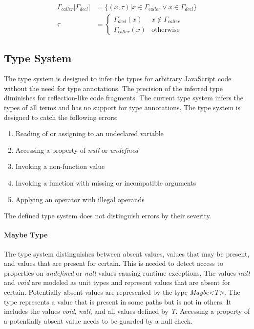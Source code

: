 \begin{align*}
	\Gamma_{caller}\Big\lbrack\Gamma_{decl}\Big\rbrack &= \lbrace (x, \tau) | x \in \Gamma_{caller} \vee x \in \Gamma_{decl} \rbrace \\
	\tau &= \begin{cases}
		\Gamma_{decl}(x) & x \notin \Gamma_{caller} \\
		\Gamma_{caller}(x) & \text{otherwise}
	\end{cases}
\end{align*}

\subsection{Type System}\label{sec:type-system}
The type system is designed to infer the types for arbitrary JavaScript code without the need for type annotations. The precision of the inferred type diminishes for reflection-like code fragments. The current type system infers the types of all terms and has no support for type annotations. The type system is designed to catch the following errors:

\begin{enumerate}
	\item Reading of or assigning to an undeclared variable\label{item:absent-values}
	\item Accessing a property of \textit{null} or \textit{undefined}\label{item:nullable}
	\item Invoking a non-function value
	\item Invoking a function with missing or incompatible arguments
	\item Applying an operator with illegal operands\label{item:illegal-operands}
\end{enumerate}


The defined type system does not distinguish errors by their severity. 

\paragraph{Maybe Type}
The type system distinguishes between absent values, values that may be present, and values that are present for certain. This is needed to detect access to properties on \textit{undefined} or \textit{null} values causing runtime exceptions. The values \textit{null} and \textit{void} are modeled as unit types and represent values that are absent for certain. Potentially absent values are represented by the type \textit{Maybe\textless T\textgreater}. The type represents a value that is present in some paths but is not in others. It includes the values \textit{void}, \textit{null}, and all values defined by \textit{T}. Accessing a property of a potentially absent value needs to be guarded by a null check.

